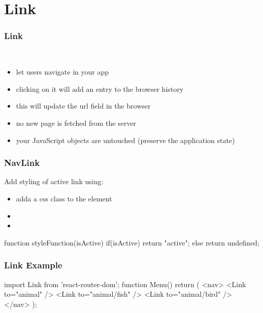 \section{Link}
\begin{frame}[fragile] \frametitle{Link}
\\ 
\begin{itemize}
    \item let users navigate in your app
    \item clicking on it will add an entry to the browser history
    \item this will update the url field in the browser
    \item no new page is fetched from the server
    \item your JavaScript objects are untouched (preserve the application state)
\end{itemize}
\end{frame}

\begin{frame}[fragile] \frametitle{NavLink}
Add styling of active link using:
\begin{itemize}
  \item adda a css class to the element
  \item {}
  \item {}
\end{itemize}

\begin{CodeBox}{}
function styleFunction(isActive) {
  if(isActive) {
    return "active";
  } else {
    return undefined;
  }
}
\end{CodeBox}
\end{frame}

\begin{frame}[fragile] \frametitle{Link Example}
\begin{CodeBox}{}
import { Link } from 'react-router-dom';
function Menu() {
  return (
    <nav>
      <Link to="animal" />
      <Link to="animal/fish" />
      <Link to="animal/bird" />
    </nav>
  );
}
\end{CodeBox}
\end{frame}

